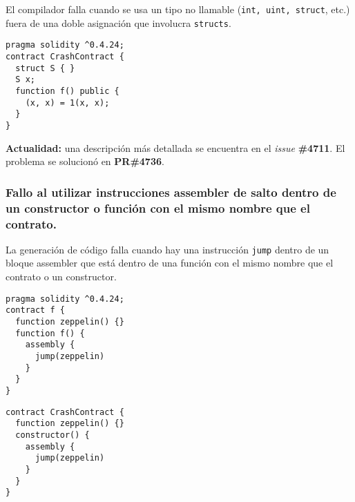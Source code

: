 El compilador falla cuando se usa un tipo no llamable (\texttt{int, uint, struct}, etc.) fuera de una doble asignación que involucra \texttt{structs}.\\

\begin{lstlisting}[language=Solidity, caption={Código de ejemplo para tipo no llamable}]
pragma solidity ^0.4.24;
contract CrashContract {
  struct S { }
  S x;
  function f() public {
    (x, x) = 1(x, x);
  }
}
\end{lstlisting}

\textbf{Actualidad:} una descripción más detallada se encuentra en el \textit{issue} \textbf{\#4711}\cite{GHI4711}. El problema se solucionó en \textbf{PR\#4736}\cite{GH4736}.\\

\subsubsection{Fallo al utilizar instrucciones assembler de salto dentro de un constructor o función con el mismo nombre que el contrato.}

La generación de código falla cuando hay una instrucción \texttt{jump} dentro de un bloque assembler que está dentro de una función con el mismo nombre que el contrato o un constructor.\\

\begin{lstlisting}[language=Solidity, caption={Código de ejemplo para uso de \texttt{jump} en bloque assembler \#1}]
pragma solidity ^0.4.24;
contract f {
  function zeppelin() {}
  function f() {
    assembly {
      jump(zeppelin)
    }
  }
}
\end{lstlisting}

\begin{lstlisting}[language=Solidity, caption={Código de ejemplo para uso de \texttt{jump} en bloque assembler \#2}]
contract CrashContract {                                                                        
  function zeppelin() {}                                                                        
  constructor() {                                                                               
    assembly {                                                                                  
      jump(zeppelin)                                                                            
    }                                                                                           
  }                                                                                             
}
\end{lstlisting}

